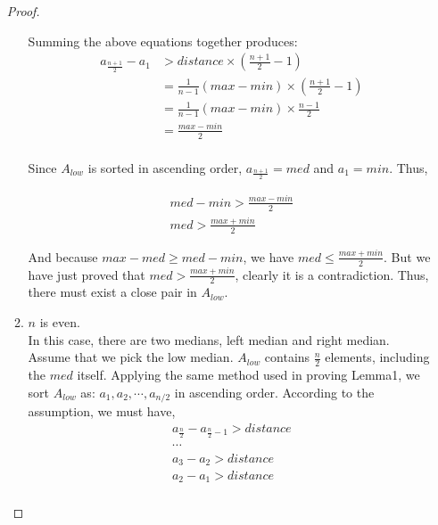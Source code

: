 \documentclass[11pt]{article}
\begin{document}
\begin{enumerate}
\begin{proof}
\begin{enumerate}
      Summing the above equations together produces:
      \begin{equation}
        \begin{split}
          a_{\frac{n+1}{2}} - a_1 &> distance \times (\frac{n+1}{2}-1)\\
          & = \frac{1}{n-1} (max - min) \times (\frac{n+1}{2}-1)\\
          & = \frac{1}{n-1} (max - min) \times \frac{n-1}{2}\\
          & = \frac{max - min}{2}\\
        \end{split}
      \end{equation}

      Since $A_{low}$ is sorted in ascending order, $a_{\frac{n+1}{2}}
      = med$ and $a_1 = min$. Thus,

      \begin{equation}
        \begin{split}
          med - min > \frac{max - min}{2}\\
          med > \frac{max+min}{2}
        \end{split}
      \end{equation}

      And because $max-med \geq med-min$, we
      have $med \leq \frac{max+min}{2}$. But we have just proved that
      $med > \frac{max+min}{2}$, clearly it is a contradiction. Thus,
      there must exist a close pair in $A_{low}$.

    \item $n$ is even.\\
      In this case, there are two medians, left median and right
      median. Assume that we pick the low median.
      $A_{low}$ contains $\frac{n}{2}$ elements,
      including the $med$ itself. Applying the same method used in
      proving Lemma1, we sort $A_{low}$ as: $a_1,
      a_2, \cdots, a_{n/2}$ in ascending order. According to the
      assumption, we must have,
      \begin{equation}
        \begin{split}
          a_{\frac{n}{2}} - a_{\frac{n}{2}-1} > distance\\
          \cdots\\
          a_3 - a_2 > distance\\
          a_2 - a_1 > distance\\
        \end{split}
      \end{equation}


\end{enumerate}
\end{proof}
\end{enumerate}
\end{document}
